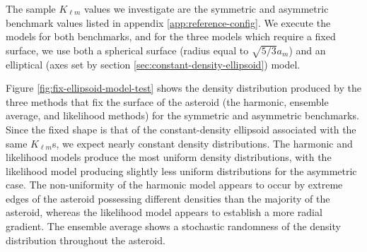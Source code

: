\documentclass{aastex631}
\begin{document}
The sample $K_{\ell m}$ values we investigate are the symmetric and asymmetric benchmark values listed in appendix \ref{app:reference-config}. We execute the models for both benchmarks, and for the three models which require a fixed surface, we use both a spherical surface (radius equal to $\sqrt{5/3} a_m$) and an elliptical (axes set by section \ref{sec:constant-density-ellipsoid}) model.

Figure \ref{fig:fix-ellipsoid-model-test} shows the density distribution produced by the three methods that fix the surface of the asteroid (the harmonic, ensemble average, and likelihood methods) for the symmetric and asymmetric benchmarks. Since the fixed shape is that of the constant-density ellipsoid associated with the same $K_{\ell m}$s, we expect nearly constant density distributions. The harmonic and likelihood models produce the most uniform density distributions, with the likelihood model producing slightly less uniform distributions for the asymmetric case. The non-uniformity of the harmonic model appears to occur by extreme edges of the asteroid possessing different densities than the majority of the asteroid, whereas the likelihood model appears to establish a more radial gradient. The ensemble average shows a stochastic randomness of the density distribution throughout the asteroid.
\end{document}
